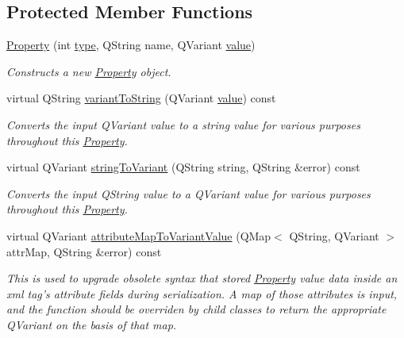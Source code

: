 \subsection*{Protected Member Functions}
\begin{DoxyCompactItemize}
\item 
\hyperlink{class_picto_1_1_property_af3df159ac9f99a9981f6292c518bdcc9}{Property} (int \hyperlink{class_picto_1_1_property_a0b2715a51a50a94a0c1447597ecd00dd}{type}, Q\-String name, Q\-Variant \hyperlink{class_picto_1_1_property_a69540c9d4f9a4b0b128b4c6a876d67ca}{value})
\begin{DoxyCompactList}\small\item\em Constructs a new \hyperlink{class_picto_1_1_property}{Property} object. \end{DoxyCompactList}\item 
virtual Q\-String \hyperlink{class_picto_1_1_property_a53fdd4e0021894ae55854cdcf5277c4a}{variant\-To\-String} (Q\-Variant \hyperlink{class_picto_1_1_property_a69540c9d4f9a4b0b128b4c6a876d67ca}{value}) const 
\begin{DoxyCompactList}\small\item\em Converts the input Q\-Variant value to a string value for various purposes throughout this \hyperlink{class_picto_1_1_property}{Property}. \end{DoxyCompactList}\item 
virtual Q\-Variant \hyperlink{class_picto_1_1_property_a97d52011d6db190c5c28a21d76ac1d3b}{string\-To\-Variant} (Q\-String string, Q\-String \&error) const 
\begin{DoxyCompactList}\small\item\em Converts the input Q\-String value to a Q\-Variant value for various purposes throughout this \hyperlink{class_picto_1_1_property}{Property}. \end{DoxyCompactList}\item 
virtual Q\-Variant \hyperlink{class_picto_1_1_property_a91505cad6a9848cc849e6cd0bc7641aa}{attribute\-Map\-To\-Variant\-Value} (Q\-Map$<$ Q\-String, Q\-Variant $>$ attr\-Map, Q\-String \&error) const 
\begin{DoxyCompactList}\small\item\em This is used to upgrade obsolete syntax that stored \hyperlink{class_picto_1_1_property}{Property} value data inside an xml tag's attribute fields during serialization. A map of those attributes is input, and the function should be overriden by child classes to return the appropriate Q\-Variant on the basis of that map. \end{DoxyCompactList}\end{DoxyCompactItemize}
